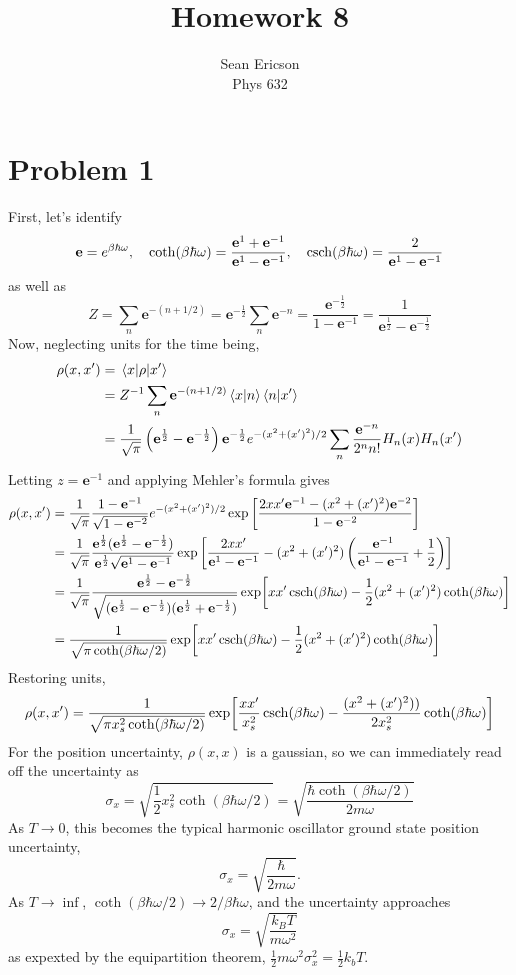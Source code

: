 \documentclass[12pt]{article}
\newcommand{\e}{\mathbf{e}}
\begin{document}
	
\title{Homework 8}
\author{Sean Ericson \\ Phys 632}
\maketitle

\section*{Problem 1}
First, let's identify
\[ \e = e^{\beta\hbar\omega}, \quad \coth(\beta\hbar\omega) = \frac{\e^1 + \e^{-1}}{\e^1 - \e^{-1}}, \quad \csch(\beta\hbar\omega) = \frac{2}{\e^1 - \e^{-1}} \]
as well as
\[ Z = \sum_n\e^{-(n+1/2)} = \e^{-\frac{1}{2}}\sum_n\e^{-n} = \frac{\e^{-\frac{1}{2}}}{1 - \e^{-1}} = \frac{1}{\e^\frac{1}{2} - \e^{-\frac{1}{2}}} \]
Now, neglecting units for the time being,
\begin{align*}
    \rho(x,x') &= \mel{x}{\rho}{x'} \\
    &= Z^{-1}\sum_n \e^{-(n+1/2)}\braket{x}{n}\braket{n}{x'} \\
    &= \frac{1}{\sqrt{\pi}}\left(\e^\frac{1}{2} - \e^{-\frac{1}{2}}\right)\e^{-\frac{1}{2}} e^{-(x^2 + (x')^2)/2}\sum_n\frac{\e^{-n}}{2^n n!}H_n(x)H_n(x') \\
\end{align*}
Letting $z = \e^{-1}$ and applying Mehler's formula gives
\begin{align*}
    \rho(x,x') &= \frac{1}{\sqrt{\pi}}\frac{1 - \e^{-1}}{\sqrt{1 - \e^{-2}}}e^{-(x^2 + (x')^2)/2}\exp\left[\frac{2xx'\e^{-1} - (x^2 + (x')^2)\e^{-2}}{1 - \e^{-2}}\right] \\
    &= \frac{1}{\sqrt{\pi}}\frac{\e^{\frac{1}{2}}(\e^{\frac{1}{2}} - \e^{-\frac{1}{2}})}{\e^{\frac{1}{2}}\sqrt{\e^1 - \e^{-1}}}\exp\left[\frac{2xx'}{\e^{1} - \e^{-1}} - (x^2 + (x')^2)\left(\frac{\e^{-1}}{\e^1 - \e^{-1}} + \frac{1}{2}\right)\right] \\
    &= \frac{1}{\sqrt{\pi}}\frac{\e^{\frac{1}{2}} - \e^{-\frac{1}{2}}}{\sqrt{(\e^{\frac{1}{2}}-\e^{-\frac{1}{2}})(\e^{\frac{1}{2}}+\e^{-\frac{1}{2}})}}\exp[xx'\csch(\beta\hbar\omega) - \frac{1}{2}(x^2 + (x')^2)\coth(\beta\hbar\omega)] \\
    &= \frac{1}{\sqrt{\pi\coth(\beta\hbar\omega/2)}}\exp[xx'\csch(\beta\hbar\omega) - \frac{1}{2}(x^2 + (x')^2)\coth(\beta\hbar\omega)] \\
\end{align*}
Restoring units,
\[ \rho(x,x') = \frac{1}{\sqrt{\pi x_s^2 \coth(\beta\hbar\omega/2)}}\exp[\frac{xx'}{x_s^2}\csch(\beta\hbar\omega) - \frac{(x^2 + (x')^2))}{2x_s^2}\coth(\beta\hbar\omega)] \]
For the position uncertainty, $\rho(x,x)$ is a gaussian, so we can immediately read off the  uncertainty as
\[ \sigma_x = \sqrt{\frac{1}{2}x_s^2\coth(\beta\hbar\omega/2)} = \sqrt{\frac{\hbar\coth(\beta\hbar\omega/2)}{2m\omega}} \]
As $T\to 0$, this becomes the typical harmonic oscillator ground state position uncertainty,
\[ \sigma_x = \sqrt{\frac{\hbar}{2m\omega}}. \]
As $T\to\inf$, $\coth(\beta\hbar\omega/2)\to 2/\beta\hbar\omega$, and the uncertainty approaches
\[ \sigma_x = \sqrt{\frac{k_BT}{m\omega^2}} \]
as expexted by the equipartition theorem, $\frac{1}{2}m\omega^2\sigma_x^2 = \frac{1}{2}k_bT$.
\end{document}

